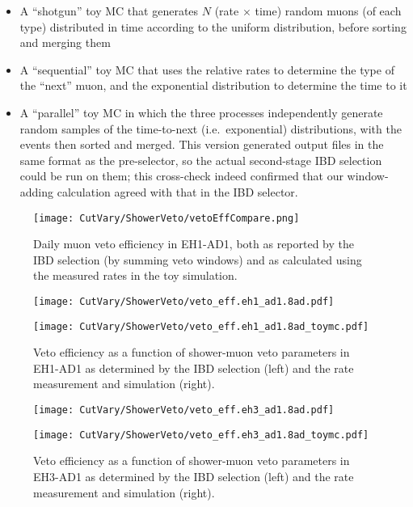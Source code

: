 \documentclass[../thesis.tex]{subfiles}
\begin{document}
\begin{itemize}
\item A ``shotgun'' toy MC that generates $N$ (rate $\times$ time) random muons (of each type) distributed in time according to the uniform distribution, before sorting and merging them
\item A ``sequential'' toy MC that uses the relative rates to determine the type of the ``next'' muon, and the exponential distribution to determine the time to it
\item A ``parallel'' toy MC in which the three processes independently generate random samples of the time-to-next (i.e.\ exponential) distributions, with the events then sorted and merged. This version generated output files in the same format as the pre-selector, so the actual second-stage IBD selection could be run on them; this cross-check indeed confirmed that our window-adding calculation agreed with that in the IBD selector.
\end{itemize}

\begin{figure}[ht]
  \texttt{[image: CutVary/ShowerVeto/vetoEffCompare.png]}
  \caption{Daily muon veto efficiency in EH1-AD1, both as reported by the IBD selection (by summing veto windows) and as calculated using the measured rates in the toy simulation.}
  \label{fig:cutVaryVetoEffCompare}
\end{figure}

\begin{figure}[ht]
  \begin{minipage}{0.5\linewidth}%
    \texttt{[image: CutVary/ShowerVeto/veto\_eff.eh1\_ad1.8ad.pdf]}%
  \end{minipage}%
  \begin{minipage}{0.5\linewidth}%
    \texttt{[image: CutVary/ShowerVeto/veto\_eff.eh1\_ad1.8ad\_toymc.pdf]}%
  \end{minipage}%
  \caption{Veto efficiency as a function of shower-muon veto parameters in EH1-AD1 as determined by the IBD selection (left) and the rate measurement and simulation (right). \marknom}
  \label{fig:cutVaryVetoEff2dNear}
\end{figure}

\begin{figure}[ht]
  \begin{minipage}{0.5\linewidth}%
    \texttt{[image: CutVary/ShowerVeto/veto\_eff.eh3\_ad1.8ad.pdf]}%
  \end{minipage}%
  \begin{minipage}{0.5\linewidth}%
    \texttt{[image: CutVary/ShowerVeto/veto\_eff.eh3\_ad1.8ad\_toymc.pdf]}%
  \end{minipage}%
  \caption{Veto efficiency as a function of shower-muon veto parameters in EH3-AD1 as determined by the IBD selection (left) and the rate measurement and simulation (right). \marknom}
  \label{fig:cutVaryVetoEff2dFar}
\end{figure}
\end{document}
